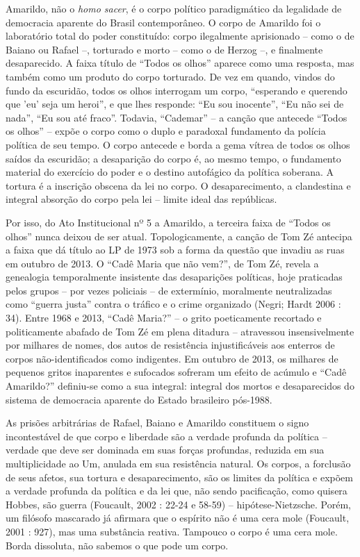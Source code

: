 Amarildo, não o \emph{homo sacer}, é o corpo político paradigmático da
legalidade de democracia aparente do Brasil contemporâneo. O corpo de
Amarildo foi o laboratório total do poder constituído: corpo ilegalmente
aprisionado -- como o de Baiano ou Rafael --, torturado e morto -- como
o de Herzog --, e finalmente desaparecido. A faixa título de ``Todos os
olhos'' aparece como uma resposta, mas também como um produto do corpo
torturado. De vez em quando, vindos do fundo da escuridão, todos os
olhos interrogam um corpo, ``esperando e querendo que 'eu' seja um
heroi'', e que lhes responde: ``Eu sou inocente'', ``Eu não sei de
nada'', ``Eu sou até fraco''. Todavia, ``Cademar'' -- a canção que
antecede ``Todos os olhos'' -- expõe o corpo como o duplo e paradoxal
fundamento da polícia política de seu tempo. O corpo antecede e borda a
gema vítrea de todos os olhos saídos da escuridão; a desaparição do
corpo é, ao mesmo tempo, o fundamento material do exercício do poder e o
destino autofágico da política soberana. A tortura é a inscrição obscena
da lei no corpo. O desaparecimento, a clandestina e integral absorção do
corpo pela lei -- limite ideal das repúblicas.

Por isso, do Ato Institucional nº 5 a Amarildo, a terceira faixa de
``Todos os olhos'' nunca deixou de ser atual. Topologicamente, a canção
de Tom Zé antecipa a faixa que dá título ao LP de 1973 sob a forma da
questão que invadiu as ruas em outubro de 2013. O ``Cadê Maria que não
vem?'', de Tom Zé, revela a genealogia temporalmente insistente das
desaparições políticas, hoje praticadas pelos grupos -- por vezes
policiais -- de extermínio, moralmente neutralizadas como ``guerra
justa'' contra o tráfico e o crime organizado (Negri; Hardt 2006 : 34).
Entre 1968 e 2013, ``Cadê Maria?'' -- o grito poeticamente recortado e
politicamente abafado de Tom Zé em plena ditadura -- atravessou
insensivelmente por milhares de nomes, dos autos de resistência
injustificáveis aos enterros de corpos não-identificados como
indigentes. Em outubro de 2013, os milhares de pequenos gritos
inaparentes e sufocados sofreram um efeito de acúmulo e ``Cadê
Amarildo?'' definiu-se como a sua integral: integral dos mortos e
desaparecidos do sistema de democracia aparente do Estado brasileiro
pós-1988.

As prisões arbitrárias de Rafael, Baiano e Amarildo constituem o signo
incontestável de que corpo e liberdade são a verdade profunda da
política -- verdade que deve ser dominada em suas forças profundas,
reduzida em sua multiplicidade ao Um, anulada em sua resistência
natural. Os corpos, a forclusão de seus afetos, sua tortura e
desaparecimento, são os limites da política e expõem a verdade profunda
da política e da lei que, não sendo pacificação, como quisera Hobbes,
são guerra (Foucault, 2002 : 22-24 e 58-59) -- hipótese-Nietzsche.
Porém, um filósofo mascarado já afirmara que o espírito não é uma cera
mole (Foucault, 2001 : 927), mas uma substância reativa. Tampouco o
corpo é uma cera mole. Borda dissoluta, não sabemos o que pode um corpo.

